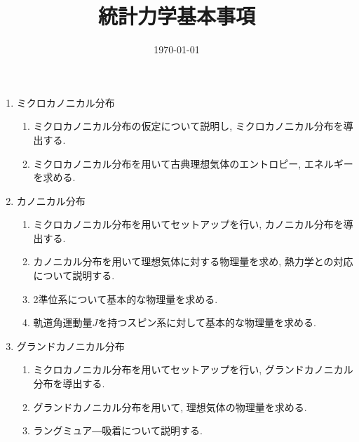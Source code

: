 \documentclass[11pt,a4paper]{jarticle}
\title{統計力学基本事項}
\author{}
\date{\today}
\begin{document}
\maketitle
\begin{enumerate}
    \item ミクロカノニカル分布
    \begin{enumerate}
        \item ミクロカノニカル分布の仮定について説明し, ミクロカノニカル分布を導出する.
        \item ミクロカノニカル分布を用いて古典理想気体のエントロピー, エネルギーを求める.
    \end{enumerate}
    \item カノニカル分布
    \begin{enumerate}
        \item ミクロカノニカル分布を用いてセットアップを行い, カノニカル分布を導出する.
        \item カノニカル分布を用いて理想気体に対する物理量を求め, 熱力学との対応について説明する.
        \item 2準位系について基本的な物理量を求める.
        \item 軌道角運動量$J$を持つスピン系に対して基本的な物理量を求める.
    \end{enumerate}
    \item グランドカノニカル分布
    \begin{enumerate}
        \item ミクロカノニカル分布を用いてセットアップを行い, グランドカノニカル分布を導出する.
        \item グランドカノニカル分布を用いて, 理想気体の物理量を求める.
        \item ラングミュア―吸着について説明する.
    \end{enumerate}
\end{enumerate}
\end{document}
